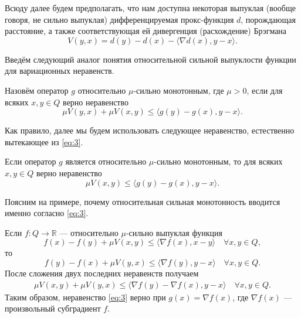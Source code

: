     Всюду далее будем предполагать, что нам доступна некоторая выпуклая (вообще говоря, не сильно выпуклая) дифференцируемая прокс-функция $d$, порождающая расстояние, а также соответствующая ей дивергенция (расхождение) Брэгмана \cite{Bauschke}
    \begin{equation}\label{Brg_form}
        V(y, x) = d(y) - d(x) - \langle \nabla d(x), y - x \rangle.
    \end{equation}

    Введём следующий аналог понятия относительной сильной выпуклости функции \cite{Lu_Nesterov_2018} для вариационных неравенств.
    \begin{definition}\label{DefRelStrongMonot}
        Назовём оператор $g$ относительно $\mu$-сильно монотонным, где $\mu >0$, если для всяких $x, y \in Q$ верно неравенство
            \begin{equation}\label{eq:3}
                 \mu V(y, x) + \mu V(x, y) \leq \langle g(y) - g(x), y - x \rangle.
             \end{equation}
    \end{definition}
    Как правило, далее мы будем использовать следующее неравенство, естественно вытекающее из \eqref{eq:3}.
    \begin{remark}
        Если оператор $g$ является  относительно $\mu$-сильно монотонным, то для всяких $x, y \in Q$ верно неравенство
        $$
            \mu V(x, y) \leq \langle g(y) - g(x), y - x \rangle.
        $$
    \end{remark}

    Поясним на примере, почему относительная сильная монотонность вводится именно согласно  \eqref{eq:3}.
    \begin{example}
        Если $f: Q \longrightarrow \mathbb{R}$ --- относительно $\mu$-сильно выпуклая функция
        \begin{equation}\label{eqrelativestorngconv}
            f(x) - f(y) + \mu V(x, y) \leq \langle \nabla{f(x)}, x - y \rangle \quad   \forall x, y \in Q,
        \end{equation}
        то
        \begin{equation}
            f(y) - f(x) + \mu V(y, x) \leq \langle \nabla{f(y)}, y - x \rangle \quad   \forall x, y \in Q.
        \end{equation}
        После сложения двух последних неравенств получаем
        \begin{align*}
            \mu V(x, y) + \mu V(y, x)\leq \langle \nabla{f(y)} - \nabla{f(x)}, y - x \rangle \quad  \forall x, y \in Q.
        \end{align*}
        Таким образом, неравенство \eqref{eq:3} верно при $g(x) = \nabla{f(x)}$, где $\nabla{f(x)}$ --- произвольный субградиент $f$.
    \end{example}

